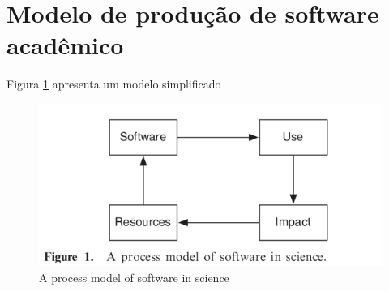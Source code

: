 %

\section{Modelo de produção de software acadêmico}



Figura \ref{process-model-scientific-software} apresenta um modelo simplificado 

\begin{figure}[h]
  \center
  \includegraphics[scale=0.5]{imagens/process-model-scientific-software.png}
  \caption{A process model of software in science \cite{howison2015understanding}}
  \label{process-model-scientific-software}
\end{figure}


